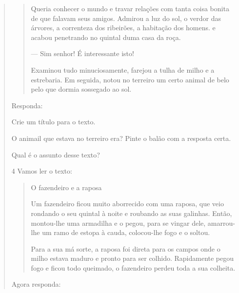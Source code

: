 \begin{verse}
\begin{quote}
Queria conhecer o mundo e travar relações com tanta coisa bonita de que
falavam seus amigos. Admirou a luz do sol, o verdor das árvores, a
correnteza dos ribeirões, a habitação dos homens. e acabou penetrando no
quintal duma casa da roça.

--- Sim senhor! É interessante isto!

Examinou tudo minuciosamente, farejou a tulha de milho e a estrebaria.
Em seguida, notou no terreiro um certo animal de belo pelo que dormia
sossegado ao sol.
\end{quote}


Responda:

\begin{escolha}
\item Crie um título para o texto.


\item O animail que estava no terreiro era? Pinte o balão com a resposta certa.

\item Qual é o assunto desse texto?

\end{escolha}

\num{4} Vamos ler o texto:


\begin{quote}
O fazendeiro e a raposa

Um fazendeiro ficou muito aborrecido com uma raposa, que veio rondando o
seu quintal à noite e roubando as suas galinhas. Então, montou-lhe uma
armadilha e o pegou, para se vingar dele, amarrou-lhe um ramo de estopa
à cauda, colocou-lhe fogo e o soltou.

Para a sua má sorte, a raposa foi direta para os campos onde o milho
estava maduro e pronto para ser colhido. Rapidamente pegou fogo e ficou
todo queimado, o fazendeiro perdeu toda a sua colheita.
\end{quote}


Agora responda:


\end{verse}
